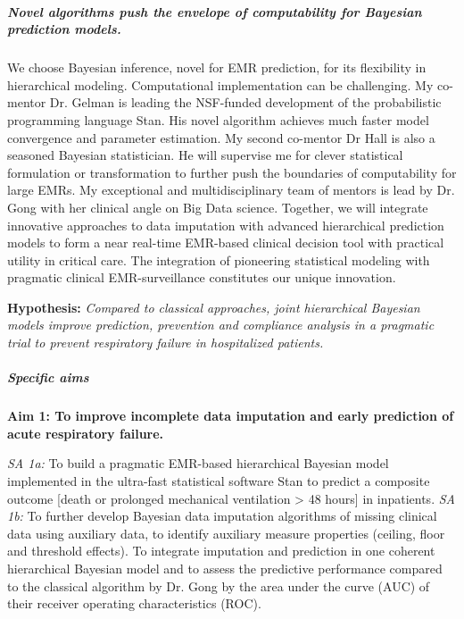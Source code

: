 \documentclass[11pt,notitlepage]{article}
\begin{document}
\subparagraph{Novel algorithms push the envelope of computability for Bayesian prediction models.} We choose Bayesian inference, novel for EMR prediction, for its flexibility in hierarchical modeling. Computational implementation can be challenging. My co-mentor Dr. Gelman is leading the NSF-funded development of the probabilistic programming language Stan. His novel algorithm achieves much faster model convergence and parameter estimation. My second co-mentor Dr Hall is also a seasoned Bayesian statistician. He will supervise me for clever statistical formulation or transformation to further push the boundaries of computability for large EMRs. My exceptional and multidisciplinary team of mentors is lead by Dr. Gong with her clinical angle on Big Data science. Together, we will integrate innovative approaches to data imputation with advanced hierarchical prediction models to form a near real-time EMR-based clinical decision tool with practical utility in critical care.  The integration of pioneering statistical modeling with pragmatic clinical EMR-surveillance constitutes our unique innovation.

\begin{flushleft}
\textbf{Hypothesis:} \textit{Compared to classical approaches, joint hierarchical Bayesian models improve prediction, prevention and compliance analysis in a pragmatic trial to prevent respiratory failure in hospitalized patients.}
\end{flushleft}
\vspace{-15pt}
\subparagraph{Specific aims}
\begin{flushleft}
\textbf{Aim 1: To improve incomplete data imputation and early prediction of acute respiratory failure.}
\end{flushleft}
\vspace{-5pt}
\textit{SA 1a:} To build a pragmatic EMR-based hierarchical Bayesian model implemented in the ultra-fast statistical software Stan to predict a composite outcome [death or prolonged mechanical ventilation > 48 hours] in inpatients.
\textit{SA 1b:} To further develop Bayesian data imputation algorithms of missing clinical data using auxiliary data, to identify auxiliary measure properties (ceiling, floor and threshold effects). To integrate imputation and prediction in one coherent hierarchical Bayesian model and to assess the  predictive performance  compared to the classical algorithm by Dr. Gong by the area under the curve (AUC) of their receiver operating characteristics (ROC).
\end{document}
